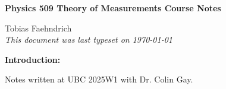 \documentclass[10pt]{article}
\begin{document}
\begin{tcolorbox}
    \begin{center}
        \begin{Large}
            \textbf{Physics 509 Theory of Measurements Course Notes} \\
            \vspace{5pt}
        \end{Large}
        \begin{large}
            Tobias Faehndrich \\
            \vspace{5pt}
            \emph{This document was last typeset on \today}
        \end{large}
    \end{center}
\end{tcolorbox}

\begin{center}
    \textbf{Introduction:}

    Notes written at UBC 2025W1 with Dr. Colin Gay.

\end{center}
\tableofcontents

\newpage


\newpage


\newpage


\newpage


\newpage


\newpage


\newpage


\newpage


\newpage



\newpage



\newpage



\newpage

\newpage


\newpage

\end{document}
